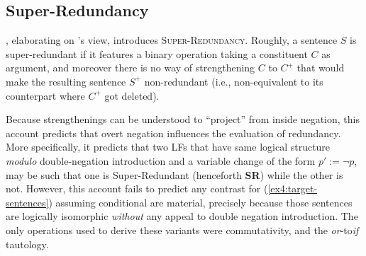 \subsection{Super-Redundancy}

\citet{Kalomoiros2024}, elaborating on \citet{Katzir2014}'s view, introduces \textsc{Super-Redundancy}. Roughly, a sentence $S$ is super-redundant if it features a binary operation taking a constituent $C$ as argument, and moreover there is no way of strengthening $C$ to $C^+$ that would make the resulting sentence $S^+$ non-redundant (i.e., non-equivalent to its counterpart where $C^+$ got deleted).

\begin{exe}
	\label{ex4:sr}
\end{exe}

Because strengthenings can be understood to ``project'' from inside negation, this account predicts that overt negation influences the evaluation of redundancy. More specifically, it predicts that two LFs that have same logical structure \textit{modulo} double-negation introduction and a variable change of the form $p' := \neg p$, may be such that one is Super-Redundant (henceforth \textbf{SR}) while the other is not. However, this account fails to predict any contrast for (\ref{ex4:target-sentences}) assuming conditional are material, precisely because those sentences are logically isomorphic \textit{without} any appeal to double negation introduction. The only operations used to derive these variants were commutativity, and the \textit{or}-to\textit{if} tautology.\\

